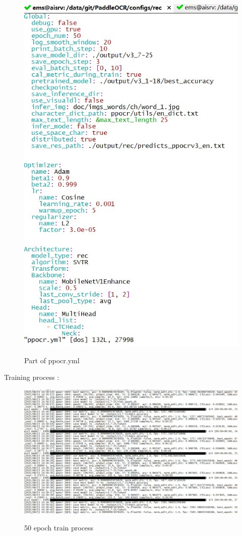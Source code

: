 \begin{figure}[H]
    \begin{center}
        \includegraphics[width=.95\linewidth]{res/paddle-ocrconf.jpg}\\
        \caption{Part of ppocr.yml}\label{paddle-ocrconf}
    \end{center}
\end{figure}

Training process :

\begin{figure}[H]
    \begin{center}
        \includegraphics[width=.95\linewidth]{res/paddle-ocrtrain.jpg}\\
        \caption{50 epoch train process }\label{paddle-ocrtrain}
    \end{center}
\end{figure}